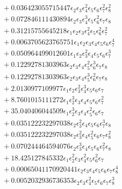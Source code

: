 \documentclass[10pt]{article}
\begin{document}
\begin{align*}
&{}  + 0.036423055715447 \epsilon_{2} \epsilon_{3} \epsilon_{4}^{2} \epsilon_{5} \epsilon_{6} \epsilon_{7}^{2} \epsilon_{8}^{2} \\
&{}  + 0.072846111430894 \epsilon_{2} \epsilon_{3} \epsilon_{4}^{3} \epsilon_{5} \epsilon_{6}^{2} \epsilon_{7} \epsilon_{8} \\
&{}  + 0.31215755645218 \epsilon_{1} \epsilon_{2} \epsilon_{3} \epsilon_{4}^{2} \epsilon_{5} \epsilon_{6}^{2} \epsilon_{7}^{2} \\
&{}  + 0.0063705623765751 \epsilon_{1} \epsilon_{2} \epsilon_{3} \epsilon_{4} \epsilon_{5} \epsilon_{6} \epsilon_{7}^{4} \\
&{}  + 0.050964499012601 \epsilon_{1} \epsilon_{2} \epsilon_{3}^{2} \epsilon_{4} \epsilon_{5} \epsilon_{6} \epsilon_{7}^{3} \\
&{}  + 0.12292781303963 \epsilon_{2} \epsilon_{3} \epsilon_{4} \epsilon_{5}^{2} \epsilon_{6}^{3} \epsilon_{7} \epsilon_{8} \\
&{}  + 0.12292781303963 \epsilon_{2} \epsilon_{3} \epsilon_{4} \epsilon_{5}^{3} \epsilon_{6}^{2} \epsilon_{7} \epsilon_{8} \\
&{}  + 2.0130977109977 \epsilon_{1} \epsilon_{2} \epsilon_{3}^{2} \epsilon_{4}^{3} \epsilon_{5} \epsilon_{6} \epsilon_{7} \\
&{}  + 8.7601015111272 \epsilon_{1} \epsilon_{2}^{3} \epsilon_{3} \epsilon_{4} \epsilon_{5} \epsilon_{6} \epsilon_{7}^{2} \\
&{}  + 35.040406044509 \epsilon_{1} \epsilon_{2}^{3} \epsilon_{3} \epsilon_{4} \epsilon_{5}^{2} \epsilon_{6} \epsilon_{7} \\
&{}  + 0.035122232297038 \epsilon_{2} \epsilon_{3}^{2} \epsilon_{4} \epsilon_{5} \epsilon_{6} \epsilon_{7}^{3} \epsilon_{8} \\
&{}  + 0.035122232297038 \epsilon_{2} \epsilon_{3}^{2} \epsilon_{4} \epsilon_{5}^{2} \epsilon_{6} \epsilon_{7} \epsilon_{8}^{2} \\
&{}  + 0.070244464594076 \epsilon_{2} \epsilon_{3}^{3} \epsilon_{4} \epsilon_{5} \epsilon_{6} \epsilon_{7}^{2} \epsilon_{8} \\
&{}  + 18.425127845332 \epsilon_{1} \epsilon_{2}^{2} \epsilon_{3} \epsilon_{4}^{2} \epsilon_{5} \epsilon_{6}^{2} \epsilon_{7} \\
&{}  + 0.00065041170920441 \epsilon_{2} \epsilon_{3} \epsilon_{4} \epsilon_{5} \epsilon_{6} \epsilon_{7} \epsilon_{8}^{4} \\
&{}  + 0.0052032936736353 \epsilon_{2} \epsilon_{3} \epsilon_{4}^{2} \epsilon_{5} \epsilon_{6} \epsilon_{7} \epsilon_{8}^{3} \\

\end{align*}
\end{document}

